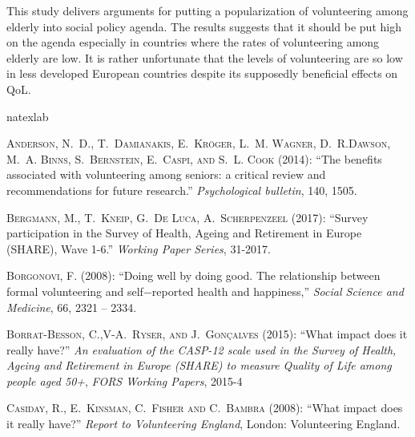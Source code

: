 \documentclass[10pt, letterpaper]{article}
\begin{document}
\begin{spacing}{1.4}
This study delivers arguments for putting a popularization of volunteering among elderly into social policy agenda. The results suggests that it should be put high on the agenda especially in countries where the rates of volunteering among elderly are low. It is rather unfortunate that the levels of volunteering are so low in less developed European countries despite its supposedly beneficial effects on QoL.

\begin{thebibliography}{87}
\newcommand{\enquote}[1]{``#1''}
\expandafter\ifx\csname natexlab\endcsname\relax\def\natexlab#1{#1}\fi

\textsc{Anderson, N.~D., T.~Damianakis, E.~Kr{\"o}ger, L.~M. Wagner, D.~R.Dawson, M.~A. Binns, S.~Bernstein, E.~Caspi, and S.~L. Cook} (2014):  \enquote{The benefits associated with volunteering among seniors: a critical  review and recommendations for future research.} \emph{Psychological bulletin}, 140, 1505.

\textsc{Bergmann, M., T.~Kneip, G.~De Luca, A.~Scherpenzeel} (2017):  \enquote{Survey participation in the Survey of Health, Ageing and Retirement in Europe (SHARE), Wave 1-6.} \emph{Working Paper Series}, 31-2017.


\textsc{Borgonovi, F.} (2008): \enquote{Doing well by doing good. The relationship between formal volunteering and self$-$reported health and happiness,} \emph{Social Science and Medicine}, 66,  2321 -- 2334.

\textsc{Borrat-Besson, C.,V-A.~Ryser, and J.~Gonçalves} (2015):  \enquote{What impact does it really have?} \emph{An evaluation of the CASP-12 scale used in the Survey of Health, Ageing and Retirement in Europe (SHARE) to measure Quality of Life among people aged 50+}, \emph{FORS Working Papers}, 2015-4


\textsc{Casiday, R., E.~Kinsman, C.~Fisher and C.~Bambra} (2008):  \enquote{What impact does it really have?} \emph{Report to Volunteering England}, London: Volunteering England.


\end{thebibliography}
\end{spacing}
\end{document}
